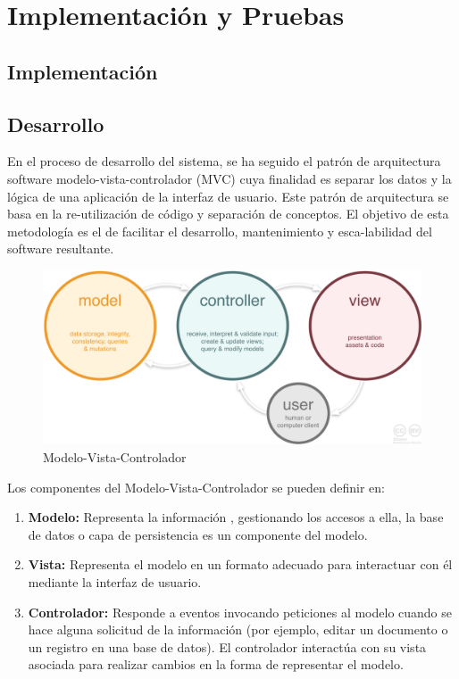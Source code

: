 \documentclass[a4paper,11pt]{book}
\begin{document}
\chapter{ Implementación y Pruebas}


\section{Implementación}

\section{Desarrollo}

En el proceso de desarrollo del sistema, se ha seguido el patrón de arquitectura software modelo-vista-controlador (MVC)\cite{mvc} cuya finalidad es separar los datos y la lógica de una aplicación de la interfaz de usuario. Este patrón de arquitectura se basa en la re-utilización de código y separación de conceptos. El objetivo de esta metodología es el de facilitar el desarrollo, mantenimiento y esca-labilidad del software resultante.

\begin{figure}[H]
\centering
\includegraphics[scale=0.20]{imagenes/mvc.png}
\caption{ Modelo-Vista-Controlador\cite{mvc2}  }
\end{figure}

Los componentes\cite{mvc3} del Modelo-Vista-Controlador se pueden definir en:

\begin{enumerate}
\item \textbf{Modelo:} Representa la información , gestionando los accesos a ella, la base de datos  o capa de persistencia es un componente del modelo.

\item \textbf{Vista:} Representa el modelo en un formato adecuado para interactuar con él mediante la interfaz de usuario.

\item \textbf{Controlador:} Responde a eventos invocando peticiones al modelo cuando se hace alguna solicitud de la información (por ejemplo, editar un documento o un registro en una base de datos). El controlador interactúa con su vista asociada para realizar cambios en la forma de representar el modelo.
\end{enumerate}
\end{document}
